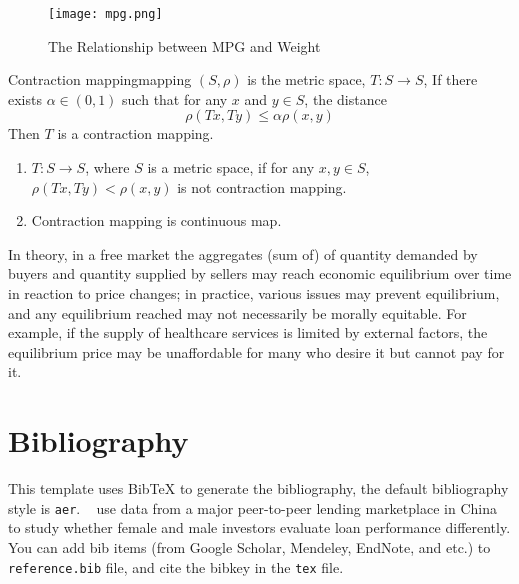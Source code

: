 \documentclass[titlestyle=hang,11pt]{elegantbook}
\begin{document}
\begin{figure}[!htbp]
	\centering
	\texttt{[image: mpg.png]}
	\caption{The Relationship between MPG and Weight\label{fig:mpg}}
\end{figure}

\begin{definition}{Contraction mapping}{mapping}
$(S,\rho)$ is the metric space, $T: S\to S$, If there exists $\alpha\in(0,1)$ such that for any $x$ and $y\in S$, the distance
\begin{equation}
\rho(Tx,Ty)\leq \alpha\rho(x,y)
\end{equation}
Then $T$ is a {\color{main} contraction mapping}.
\end{definition}

\begin{remark}
\begin{enumerate}[noitemsep]
\item $T:S\to S$, where $S$ is a metric space, if  for any $x,y\in S$, $\rho(Tx,Ty)<\rho(x,y)$ is not contraction mapping.
\item Contraction mapping is continuous map.
\end{enumerate}
\end{remark}


\begin{conclusion}
In theory, in a free market the aggregates (sum of) of quantity demanded by buyers and quantity supplied by sellers may reach economic equilibrium over time in reaction to price changes; in practice, various issues may prevent equilibrium, and any equilibrium reached may not necessarily be morally equitable. For example, if the supply of healthcare services is limited by external factors, the equilibrium price may be unaffordable for many who desire it but cannot pay for it.
\end{conclusion}

\section{Bibliography}
This template uses Bib\TeX{} to generate the bibliography, the default bibliography style is \verb|aer|. ~\cite{Chen2018} use data from a major peer-to-peer lending marketplace in China to study whether female and male investors evaluate loan performance differently. You can add bib items (from Google Scholar, Mendeley, EndNote, and etc.) to \verb|reference.bib| file, and cite the bibkey in the \verb|tex| file.


\nocite{EINAV2010,Havrylchyk2018} 




\end{document}
